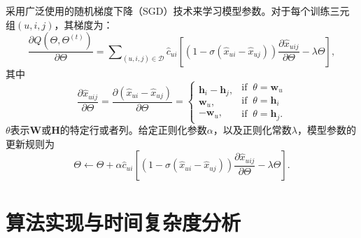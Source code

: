 \par
采用广泛使用的随机梯度下降（SGD）技术来学习模型参数。对于每个训练三元组$(u,i,j)$，其梯度为：
\begin{equation}\label{Eq:Gradient1}
	\frac{{\partial Q(\Theta, \Theta^{(t)} )}}{{\partial \Theta }} = \sum\nolimits_{(u,i,j) \in \mathcal{D}} \hat{c}_{ui} [ (1 - \sigma(\hat{x}_{ui}-\hat{x}_{uj}))\frac{\partial\hat{x}_{uij}}{\partial\Theta} - \lambda\Theta ],
\end{equation}
其中
\begin{equation}\label{Eq:Gradient2}
	\frac{{\partial {{\hat x}_{uij}}}}{{\partial \Theta }} = \frac{{\partial ({{\hat x}_{ui}} - {{\hat x}_{uj}})}}{{\partial \Theta }} = \left\{ {\begin{array}{*{20}{l}}
			{\mathbf{h}}_i - \mathbf{h}_j,\\
			{\mathbf{w}}_{u},\\
			{ - \mathbf{w}}_{u},
		\end{array}\begin{array}{*{20}{l}}
			{\mathrm{if} \;\; \theta  = {\mathbf{w}}_u}\\
			{\mathrm{if} \;\; \theta  = {\mathbf{h}}_i}\\
			{\mathrm{if} \;\; \theta  = {\mathbf{h}}_j}.
	\end{array}} \right.
\end{equation}
$\theta$表示$\mathbf{W}$或$\mathbf{H}$的特定行或者列。给定正则化参数$\alpha$，以及正则化常数$\lambda$，模型参数的更新规则为
\begin{equation}\label{Eq:Updating}
	\Theta  \leftarrow \Theta  + \alpha \hat{c}_{ui} [ (1 - \sigma(\hat{x}_{ui}-\hat{x}_{uj}))\frac{\partial\hat{x}_{uij}}{\partial\Theta} - \lambda\Theta ].
\end{equation}
\section{算法实现与时间复杂度分析}
